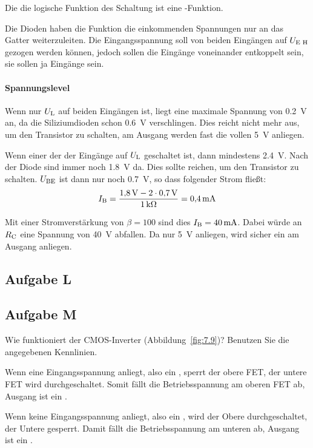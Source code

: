 Die die logische Funktion des Schaltung ist eine \tnor-Funktion.

Die Dioden
haben die Funktion die einkommenden Spannungen nur an das Gatter
weiterzuleiten. Die Eingangsspannung soll von beiden Eingängen auf $\UEH$
gezogen werden können, jedoch sollen die Eingänge voneinander entkoppelt sein,
sie sollen ja Eingänge sein.

\paragraph{Spannungslevel}

Wenn nur $\UL$ auf beiden Eingängen ist, liegt eine maximale Spannung von
\SI{.2}{\volt} an, da die Siliziumdioden schon \SI{.6}{\volt} verschlingen.
Dies reicht nicht mehr aus, um den Transistor zu schalten, am Ausgang werden
fast die vollen \SI{5}{\volt} anliegen.

Wenn einer der der Eingänge auf $\UL$ geschaltet ist, dann mindestens
\SI{2.4}{\volt}. Nach der Diode sind immer noch \SI{1.8}{\volt} da. Dies sollte
reichen, um den Transistor zu schalten. $\UBE$ ist dann nur noch
\SI{.7}{\volt}, so dass folgender Strom fließt:
\[
	\IB = \frac{\SI{1.8}\volt - 2 \cdot \SI{.7}\volt}{\SI1{\kilo\ohm}}
	= \SI{.4}{\milli\ampere}
\]

Mit einer Stromverstärkung von $\beta = 100$ sind dies $\IB =
\SI{40}{\milli\ampere}$. Dabei würde an $\RC$ eine Spannung von \SI{40}{\volt}
abfallen. Da nur \SI{5}{\volt} anliegen, wird sicher ein \thigh{} am Ausgang
anliegen.

\subsection{Aufgabe L}

\fehlt

\subsection{Aufgabe M}

\begin{problem}
	Wie funktioniert der CMOS-Inverter (Abbildung~\ref{fig:7.9})? Benutzen Sie
	die angegebenen Kennlinien.
\end{problem}

Wenn eine Eingangsspannung anliegt, also ein \thigh, sperrt der obere FET, der
untere FET wird durchgeschaltet. Somit fällt die Betriebsspannung am oberen FET
ab, Ausgang ist ein \tlow.

Wenn keine Eingangsspannung anliegt, also ein \tlow, wird der Obere
durchgeschaltet, der Untere gesperrt. Damit fällt die Betriebsspannung am
unteren ab, Ausgang ist ein \thigh.

